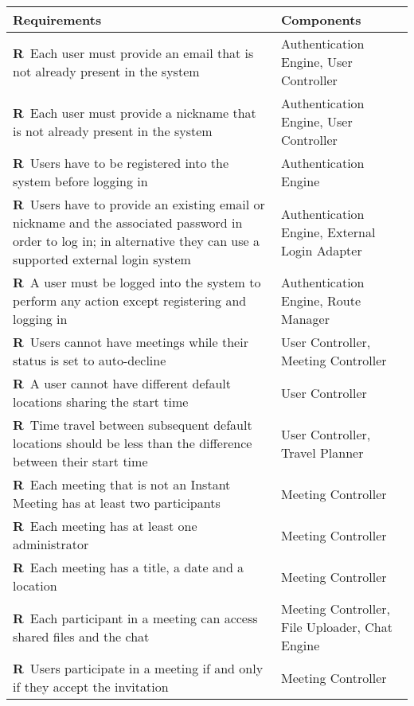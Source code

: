 \newcommand{\reqNum}{\stepcounter{countReq}\thecountReq}

\def\arraystretch{1.5}
\begin{longtable}{|m{7cm}|m{7cm}|}
	\hline
	\textbf{Requirements}            & 		\textbf{Components}		    \\ \hline
	\textbf{R\reqNum}~Each user must provide an email that is not already present in the system & Authentication Engine, User Controller	\\ \hline
	\textbf{R\reqNum}~Each user must provide a nickname that is not already present in the system & Authentication Engine, User Controller	\\ \hline
	\textbf{R\reqNum}~Users have to be registered into the system before logging in & Authentication Engine	\\ \hline
	\textbf{R\reqNum}~Users have to provide an existing email or nickname and the associated password in order to log in; in alternative they can use a supported external login system & Authentication Engine, External Login Adapter	\\ \hline
	\textbf{R\reqNum}~A user must be logged into the system to perform any action except registering and logging in & Authentication Engine, Route Manager	\\ \hline
	\textbf{R\reqNum}~Users cannot have meetings while their status is set to auto-decline & User Controller, Meeting Controller	\\ \hline
	\textbf{R\reqNum}~A user cannot have different default locations sharing the start time & User Controller	\\ \hline
	\textbf{R\reqNum}~Time travel between subsequent default locations should be less than the difference between their start time & User Controller, Travel Planner	\\ \hline
	\textbf{R\reqNum}~Each meeting that is not an Instant Meeting has at least two participants & Meeting Controller	\\ \hline
	\textbf{R\reqNum}~Each meeting has at least one administrator & Meeting Controller	\\ \hline
	\textbf{R\reqNum}~Each meeting has a title, a date and a location & Meeting Controller	\\ \hline
	\textbf{R\reqNum}~Each participant in a meeting can access shared files and the chat & Meeting Controller, File Uploader, Chat Engine	\\ \hline
	\textbf{R\reqNum}~Users participate in a meeting if and only if they accept the invitation & Meeting Controller	\\ \hline

\end{longtable}
